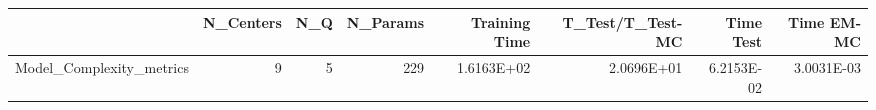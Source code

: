 \begin{tabular}{lrrrrrrr}
\toprule
{} &  N\_Centers &  N\_Q &  N\_Params &  Training Time &  T\_Test/T\_Test-MC &  Time Test &  Time EM-MC \\
\midrule
Model\_Complexity\_metrics &          9 &    5 &       229 &     1.6163E+02 &        2.0696E+01 & 6.2153E-02 &  3.0031E-03 \\
\bottomrule
\end{tabular}
